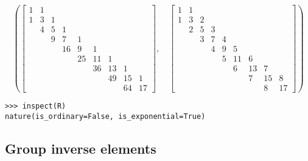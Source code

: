 \begin{example}
\begin{verbatim}
\end{verbatim}
\begin{displaymath}
\left ( \left[\begin{matrix}1 & 1 &   &   &   &   &   &   &  \\1 & 3 & 1 &   &   &   &   &   &  \\  & 4 & 5 & 1 &   &   &   &   &  \\  &   & 9 & 7 & 1 &   &   &   &  \\  &   &   & 16 & 9 & 1 &   &   &  \\  &   &   &   & 25 & 11 & 1 &   &  \\  &   &   &   &   & 36 & 13 & 1 &  \\  &   &   &   &   &   & 49 & 15 & 1\\  &   &   &   &   &   &   & 64 & 17\end{matrix}\right], \quad \left[\begin{matrix}1 & 1 &   &   &   &   &   &   &  \\1 & 3 & 2 &   &   &   &   &   &  \\  & 2 & 5 & 3 &   &   &   &   &  \\  &   & 3 & 7 & 4 &   &   &   &  \\  &   &   & 4 & 9 & 5 &   &   &  \\  &   &   &   & 5 & 11 & 6 &   &  \\  &   &   &   &   & 6 & 13 & 7 &  \\  &   &   &   &   &   & 7 & 15 & 8\\  &   &   &   &   &   &   & 8 & 17\end{matrix}\right]\right )
\end{displaymath}
\begin{verbatim}
>>> inspect(R)
nature(is_ordinary=False, is_exponential=True)
\end{verbatim}
\end{example}

\subsection{Group inverse elements}

